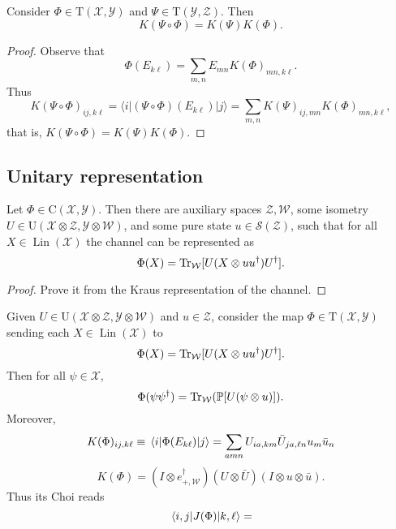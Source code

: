 \documentclass[12pt]{report}
\newcommand{\PP}{\mathbb{P}}
\newcommand{\calY}{{\mathcal{Y}}}
\newcommand{\calS}{{\mathcal{S}}}
\newcommand{\calW}{{\mathcal{W}}}
\newcommand{\calX}{{\mathcal{X}}}
\newcommand{\calZ}{{\mathcal{Z}}}
\newcommand{\rmC}{{\mathrm{C}}}
\newcommand{\rmT}{{\mathrm{T}}}
\newcommand{\rmU}{{\mathrm{U}}}
\DeclareMathOperator{\Lin}{Lin}
\begin{document}
\begin{prop}
	Consider $\Phi\in\rmT(\calX,\calY)$ and $\Psi\in\rmT(\calY,\calZ)$.
	Then
	\begin{equation}
		K(\Psi\circ\Phi)
		= K(\Psi) K(\Phi).
	\end{equation}
\end{prop}
\begin{proof}
	Observe that
	\begin{equation}
		\Phi(E_{k\ell}) = \sum_{m,n} E_{mn} K(\Phi)_{mn,k\ell}.
	\end{equation}
	Thus
	\begin{equation}
		K(\Psi\circ\Phi)_{ij,k\ell}
		= \langle i| (\Psi\circ\Phi) (E_{k\ell}) | j\rangle
		= \sum_{m,n} K(\Psi)_{ij,mn} K(\Phi)_{mn,k\ell},
	\end{equation}
	that is, $K(\Psi\circ\Phi) = K(\Psi)K(\Phi)$.
\end{proof}

\subsection{Unitary representation}

\begin{prop}\label{prop:CPTP_unitary_representation}
	Let $\Phi\in\rmC(\calX,\calY)$. Then there are auxiliary spaces $\calZ,\calW$, some isometry $U\in\rmU(\calX\otimes\calZ,\calY\otimes\calW)$, and some pure state $u\in\calS(\calZ)$, such that for all $X\in\Lin(\calX)$ the channel can be represented as
	\begin{equation}
		\Phi(X) = \Tr_\calW[U(X\otimes uu^\dagger) U^\dagger ].
	\end{equation}
\end{prop}
\begin{proof}
	Prove it from the Kraus representation of the channel.
\end{proof}

\begin{prop}
	Given $U\in\rmU(\calX\otimes\calZ,\calY\otimes\calW)$ and $u\in\calZ$, consider the map $\Phi\in\rmT(\calX,\calY)$ sending each $X\in\Lin(\calX)$ to
	\begin{equation}
		\Phi(X) = \Tr_\calW[U(X\otimes uu^\dagger)U^\dagger].
	\end{equation}
	Then for all $\psi\in\calX$,
	\begin{equation}
		\Phi(\psi\psi^\dagger) = \Tr_\calW(\PP[U(\psi\otimes u)]).
	\end{equation}
	Moreover,
	\begin{equation}
		K(\Phi)_{ij,k\ell}
		\equiv \mel{i}{\Phi(E_{k\ell})}{j}
		= \sum_{amn}
		U_{ia,km} \bar U_{ja,\ell n} u_m \bar u_n
	\end{equation}
	\begin{equation}
		K(\Phi) =
		(I\otimes e_{+,\calW}^\dagger)
		(U\otimes \bar U)
		(I \otimes u \otimes \bar u).
	\end{equation}
	Thus its Choi reads
	\begin{equation}
		\mel{i,j}{J(\Phi)}{k,\ell}
		= 
	\end{equation}
\end{prop}
\end{document}
